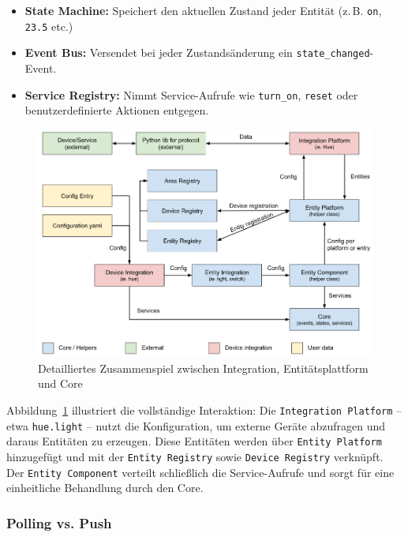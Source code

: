 \begin{itemize}
    \item \textbf{State Machine:} Speichert den aktuellen Zustand jeder Entität (z.\,B. \texttt{on}, \texttt{23.5} etc.)\\
    \item \textbf{Event Bus:} Versendet bei jeder Zustandsänderung ein \texttt{state\_changed}-Event.\\
    \item \textbf{Service Registry:} Nimmt Service-Aufrufe wie \texttt{turn\_on}, \texttt{reset} oder benutzerdefinierte Aktionen entgegen.
\end{itemize}

\begin{figure}[H]
    \centering
    \includegraphics[width=\linewidth]{images/Entity_interaction_Home_assistant.png}
    \caption{Detailliertes Zusammenspiel zwischen Integration, Entitätsplattform und Core}
    \label{fig:entity-detailed}
\end{figure}

Abbildung~\ref{fig:entity-detailed} illustriert die vollständige Interaktion: Die \texttt{Integration Platform} – etwa \texttt{hue.light} – nutzt die Konfiguration, um externe Geräte abzufragen und daraus Entitäten zu erzeugen. Diese Entitäten werden über \texttt{Entity Platform} hinzugefügt und mit der \texttt{Entity Registry} sowie \texttt{Device Registry} verknüpft. Der \texttt{Entity Component} verteilt schließlich die Service-Aufrufe und sorgt für eine einheitliche Behandlung durch den Core.


\subsubsection{Polling vs. Push}

